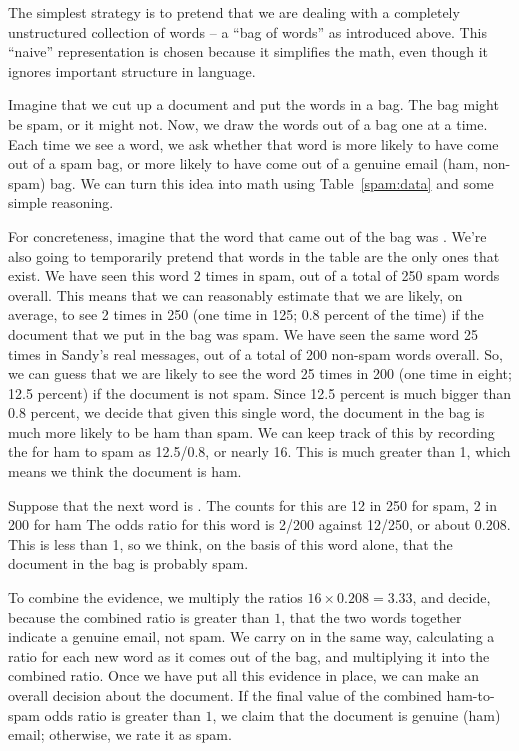 
The simplest strategy is to pretend that we are dealing with a completely unstructured collection of words -- a ``bag of words'' as introduced above.   This ``naive'' representation is chosen because it simplifies the math, even though it ignores important structure in language.  


Imagine that we cut up a document and put the words in a bag. The bag might
be spam, or it might not.  Now, we draw the words out of a bag one at a
time. Each time we see a word, we ask whether that word is more likely
to have come out of a spam bag, or more likely to have
come out of a genuine email (ham, non-spam) bag. We can turn this idea into
math using Table~\ref{spam:data} and some simple reasoning.

For concreteness, imagine that the word that came out of the bag was
.  We're also going to temporarily pretend that words in the
table are the only ones that exist.  We have seen this word 2 times in spam, out of a total of 250 spam words overall.  This
means that we can reasonably estimate that we are likely, on average,
to see  2 times in 250 (one time in 125; 0.8 percent of the
time) if the document that we put in the bag was spam. We have seen
the same word 25 times in Sandy's real messages, out of a total of 200
non-spam words overall. So, we can guess that we are likely to see the
word  25 times in 200 (one time in eight; 12.5 percent) if the document is not
spam.  Since 12.5 percent is much bigger than 0.8 percent, we decide that given this single word,  the document in the bag is much more likely to be
ham than spam.  We can keep track of this by recording the
 for ham to spam as 12.5/0.8, or nearly 16. This
is much greater than 1, which means we think the document is ham.

Suppose that the next word is . The counts for this are 12 in
250 for spam, 2 in 200 for ham The odds ratio for this word is 2/200
against 12/250, or about 0.208. This is less than 1, so we think, on
the basis of this word alone, that the document in the bag is probably
spam.

To combine the evidence, we multiply the ratios $16 \times 0.208 =
3.33$, and decide, because the combined ratio is greater than $1$,
that the two words together indicate a genuine email, not
spam. We carry on in the same way, calculating a ratio for each new
word as it comes out of the bag, and multiplying it into the combined
ratio.
Once we have put all this evidence in place, we can make an overall
decision about the document. If the final value of the combined ham-to-spam odds ratio
is greater than $1$, we claim that the document is genuine (ham) email;
otherwise, we rate it as spam.

